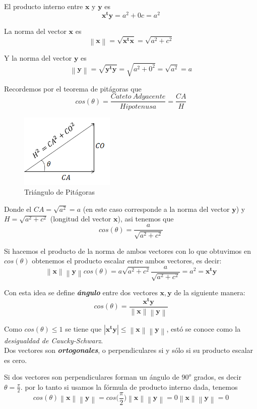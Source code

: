 \documentclass[12pt,letterpaper]{report} %
\begin{document}
El producto interno entre $\mathbf{x}$ y $\mathbf{y}$ es $$\mathbf{x^ty}=a^2+ 0c=a^2$$

La norma del vector $\mathbf{x}$ es $$\left\| \mathbf{x} \right\|=\sqrt{\mathbf{x^tx}}=\sqrt{a^2+c^2}$$

Y la norma del vector $\mathbf{y}$ es $$\left\| \mathbf{y} \right\|=\sqrt{\mathbf{y^ty}}=\sqrt{a^2+0^2}=\sqrt{a^2}=a$$

Recordemos por el teorema de pitágoras que 
$$cos(\theta)=\frac{Cateto\ Adyacente}{Hipotenusa}=\frac{CA}{H}$$

\begin{figure}
	\caption{Triángulo de Pitágoras}
	\centering
	\includegraphics[width=0.4\textwidth]{img/triangulo1.png}
\end{figure}

Donde el $CA=\sqrt{a^2}=a$ (en este caso corresponde a la norma del vector $\mathbf{y}$) y $H=\sqrt{a^2+c^2}$ (longitud del vector $\mathbf{x}$), asi tenemos que
$$cos(\theta)=\frac{a}{\sqrt{a^2+c^2}}$$

Si hacemos el producto de la norma de ambos vectores con lo que obtuvimos en $cos(\theta)$ obtenemos el producto escalar entre ambos vectores, es decir:
$$\left\| \mathbf{x} \right\|\left\| \mathbf{y} \right\| cos(\theta)=a \sqrt{a^2+c^2}\frac{a}{\sqrt{a^2+c^2}}=a^2=\mathbf{x^ty}$$

Con esta idea se define \textit{\textbf{ángulo}} entre dos vectores $\mathbf{x},\mathbf{y}$ de la siguiente manera:
$$cos(\theta)=\frac{\mathbf{x^ty}}{\left\| \mathbf{x} \right\|\left\| \mathbf{y} \right\|}$$

Como $cos(\theta)\le 1$ se tiene que $|\mathbf{x^ty}| \le\left\| \mathbf{x} \right\|\left\| \mathbf{y} \right\|$, estó se conoce como la \textit{desigualdad de Caucky-Schwarz}. \\

Dos vectores son \textit{\textbf{ortogonales}}, o perpendiculares si y sólo si su producto escalar es cero.

Si dos vectores son perpendiculares forman un ángulo de $90^o$ grados, es decir $\theta=\frac{\pi}{2}$. por lo tanto si usamos la fórmula de producto interno dada, tenemos
$$cos(\theta)\left\| \mathbf{x} \right\|\left\| \mathbf{y} \right\|=cos\bigg(\frac{\pi}{2}\bigg)\left\| \mathbf{x} \right\|\left\| \mathbf{y} \right\|=0\left\| \mathbf{x} \right\|\left\| \mathbf{y} \right\|=0$$
\end{document}
